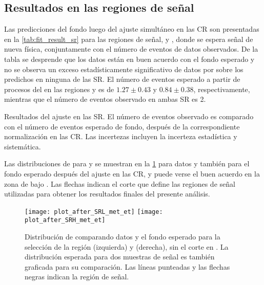 \subsection{Resultados en las regiones de señal}

Las predicciones del fondo luego del ajuste simultáneo en las CR son presentadas
en la \cref{tab:fit_result_sr} para las regiones de señal, {\SRL} y {\SRH},
donde se espera señal de nueva física, conjuntamente con el número de eventos de
datos observados. De la tabla se desprende que los datos están en
buen acuerdo con el fondo esperado y no se observa un exceso estadísticamente
significativo de datos por sobre los predichos en ninguna de las SR. El número
de eventos esperado a partir de procesos del {\SM} en las regiones {\SRL} y
{\SRH} es de $1.27\pm0.43$ y $0.84\pm0.38$, respectivamente, mientras que el
número de eventos observado en ambas SR es 2.

\begin{table}[!htbp]
  \centering

  \caption{Resultados del ajuste en las SR. El número de eventos observado es comparado con el número de
    eventos esperado de fondo, después de la correspondiente normalización en
    las CR. Las incertezas incluyen la incerteza estadística y sistemática.}
  \label{tab:fit_result_sr}

  

\end{table}


Las distribuciones de {\met} para {\SRL} y {\SRH} se muestran en la
\cref{fig:met_sr} para datos y también para el fondo esperado después del ajuste
en las CR, y puede verse el buen acuerdo en la zona de bajo {\met}. Las flechas
indican el corte que define las regiones de señal utilizadas para obtener los
resultados finales del presente análisis.


\begin{figure}[!htbp]

  \centering

  \texttt{[image: plot\_after\_SRL\_met\_et]}
  \texttt{[image: plot\_after\_SRH\_met\_et]}

  \caption{Distribución de {\met} comparando datos y el fondo esperado para la
    selección de la región {\SRL} (izquierda) y {\SRH} (derecha), sin el corte
    en {\met}. La distribución esperada para dos muestras de señal es también
    graficada para su comparación. Las líneas punteadas y las flechas negras indican
    la región de señal.}
  \label{fig:met_sr}

\end{figure}


